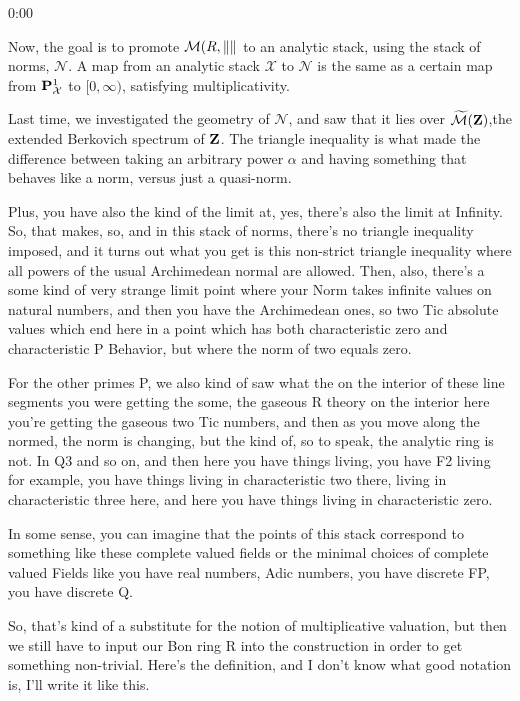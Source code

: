 \begin{unfinished}{0:00}

Now, the goal is to promote $\BerkSpec(R,{\norm{}}$ to an analytic stack, using the stack of norms, $\mathcal{N}$. A map from an analytic stack $\mathcal{X}$ to $\mathcal{N}$ is the same as a certain map from $\P^1_{\mathcal{X}}$ to $[0, \infty)$, satisfying multiplicativity.

Last time, we investigated the geometry of $\mathcal{N}$, and saw that it lies over $\ExtBerkSpec(\Z)$,the extended Berkovich spectrum of $\Z$. The triangle inequality is what made the difference between taking an arbitrary power $\alpha$ and having something that behaves like a norm, versus just a quasi-norm.

Plus, you have also the kind of the limit at, yes, there's also the limit at Infinity. So, that makes, so, and in this stack of norms, there's no triangle inequality imposed, and it turns out what you get is this non-strict triangle inequality where all powers of the usual Archimedean normal are allowed. Then, also, there's a some kind of very strange limit point where your Norm takes infinite values on natural numbers, and then you have the Archimedean ones, so two Tic absolute values which end here in a point which has both characteristic zero and characteristic P Behavior, but where the norm of two equals zero.

For the other primes P, we also kind of saw what the on the interior of these line segments you were getting the some, the gaseous R theory on the interior here you're getting the gaseous two Tic numbers, and then as you move along the normed, the norm is changing, but the kind of, so to speak, the analytic ring is not. In Q3 and so on, and then here you have things living, you have F2 living for example, you have things living in characteristic two there, living in characteristic three here, and here you have things living in characteristic zero.

In some sense, you can imagine that the points of this stack correspond to something like these complete valued fields or the minimal choices of complete valued Fields like you have real numbers, Adic numbers, you have discrete FP, you have discrete Q.

So, that's kind of a substitute for the notion of multiplicative valuation, but then we still have to input our Bon ring R into the construction in order to get something non-trivial. Here's the definition, and I don't know what good notation is, I'll write it like this.


\end{unfinished}
